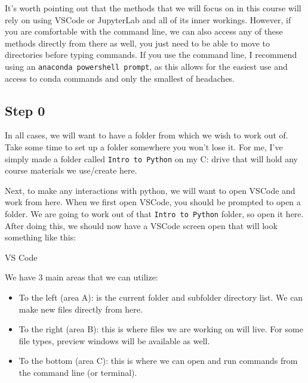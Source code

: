 \documentclass[
  letterpaper,
  DIV=11,
  numbers=noendperiod]{scrreprt}
\providecommand{\tightlist}{%
  \setlength{\itemsep}{0pt}\setlength{\parskip}{0pt}}\usepackage{longtable,booktabs,array}
\begin{document}
\begin{tcolorbox}[enhanced jigsaw, colframe=quarto-callout-tip-color-frame, toprule=.15mm, colback=white, leftrule=.75mm, rightrule=.15mm, breakable, colbacktitle=quarto-callout-tip-color!10!white, arc=.35mm, bottomtitle=1mm, bottomrule=.15mm, titlerule=0mm, title=\textcolor{quarto-callout-tip-color}{\faLightbulb}\hspace{0.5em}{Tip: Using the command line}, toptitle=1mm, left=2mm, opacityback=0, coltitle=black, opacitybacktitle=0.6]
It's worth pointing out that the methods that we will focus on in this
course will rely on using VSCode or JupyterLab and all of its inner
workings. However, if you are comfortable with the command line, we can
also access any of these methods directly from there as well, you just
need to be able to move to directories before typing commands. If you
use the command line, I recommend using an
\texttt{anaconda\ powershell\ prompt}, as this allows for the easiest
use and access to conda commands and only the smallest of headaches.
\end{tcolorbox}

\hypertarget{step-0}{%
\subsection{Step 0}\label{step-0}}

In all cases, we will want to have a folder from which we wish to work
out of. Take some time to set up a folder somewhere you won't lose it.
For me, I've simply made a folder called \texttt{Intro\ to\ Python} on
my C: drive that will hold any course materials we use/create here.

Next, to make any interactions with python, we will want to open VSCode
and work from here. When we first open VSCode, you should be prompted to
open a folder. We are going to work out of that
\texttt{Intro\ to\ Python} folder, so open it here. After doing this, we
should now have a VSCode screen open that will look something like this:

VS Code

We have 3 main areas that we can utilize:

\begin{itemize}
\tightlist
\item
  To the left (area A): is the current folder and subfolder directory
  list. We can make new files directly from here.
\item
  To the right (area B): this is where files we are working on will
  live. For some file types, preview windows will be available as well.
\item
  To the bottom (area C): this is where we can open and run commands
  from the command line (or terminal).
\end{itemize}
\end{document}
